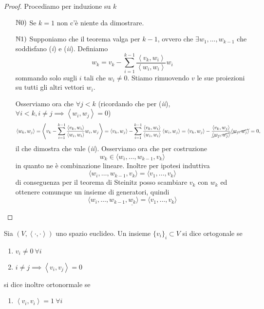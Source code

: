 \documentclass{article}     %
\let\undl\underline
\newcommand{\scp}[1][\cdot,\cdot]{\left\langle #1 \right\rangle}
\begin{document}
\begin{proof}
    Procediamo per induzione su $k$
    \begin{enumerate}
        \item[$\mathbb{N}0)$] Se $k=1$ non c'è niente da dimostrare.
        \item[$\mathbb{N}1)$] Supponiamo che il teorema valga per $k-1$, ovvero che $\exists w_1, \dots, w_{k-1}$ che soddisfano (\textit{i}) e (\textit{ii}). Definiamo 
        \[w_k=v_k-\sum_{i=1}^{k-1}\frac{\scp[v_k,w_i]}{\scp[w_i,w_i]}w_i\]
        sommando solo sugli $i$ tali che $w_i\neq 0$. Stiamo rimuovendo $v$ le sue proiezioni su tutti gli altri vettori $w_i$.

        Osserviamo ora che $\forall j<k$ (ricordando che per (\textit{ii}), $\forall i < k, i\neq j\implies \scp[w_i,w_j]=0$)
        \[\scp[w_k,w_j]=\scp[v_k-\sum_{i=1}^{k-1}\frac{\scp[v_k,w_i]}{\scp[w_i,w_i]}w_i, w_j] = \scp[v_k,w_j]-\sum_{i=1}^{k-1}\frac{\scp[v_k,w_i]}{\scp[w_i,w_i]}\scp[w_i,w_j] = \scp[v_k,w_j]-\frac{\scp[v_k,w_j]}{\cancel{\scp[w_j,w_j]}}\cancel{\scp[w_j,w_j]}=0,\]
        il che dimostra che vale (\textit{ii}). Osserviamo ora che per costruzione 
        \[w_k\in \langle w_i, \dots, w_{k-1}, v_k \rangle\]
        in quanto ne è combinazione lineare. Inoltre per ipotesi induttiva
        \[\langle w_i, \dots, w_{k-1}, v_k \rangle=\langle v_1, \dots, v_k\rangle\]
        di conseguenza per il teorema di Steinitz posso scambiare $v_k$ con $w_k$ ed ottenere comunque un insieme di generatori, quindi 
        \[\langle w_i, \dots, w_{k-1},\undl{w_k} \rangle=\langle v_1, \dots, v_k\rangle\]
    \end{enumerate}
\end{proof}

\begin{boxdef}
    Sia $(V,\scp)$ uno spazio euclideo. Un insieme $\{v_i\}_i\subset V$ si dice ortogonale se 
    \begin{enumerate}[label=\it\roman*)]
        \item $v_i\neq 0\ \forall i$
        \item $i\neq j \implies \scp[v_i,v_j]=0$
    \end{enumerate}
    si dice inoltre ortonormale se 
    \begin{enumerate}[label=\it\roman*), resume]
        \item $\scp[v_i,v_i]=1\ \forall i$
    \end{enumerate}
\end{boxdef}
\end{document}
